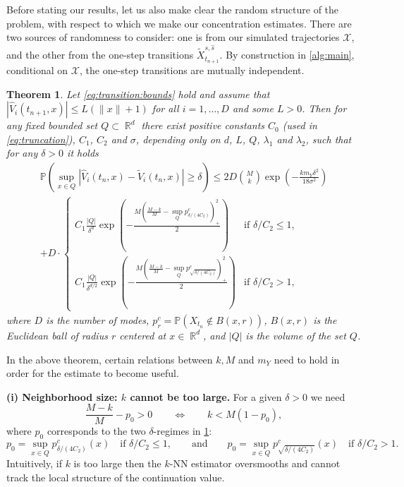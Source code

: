\documentclass[11pt,reqno,a4paper]{amsart}
\newtheorem{theorem}{Theorem}[section]
\theoremstyle{definition}
\numberwithin{equation}{section}
\renewcommand{\P}{\mathbb{P}}
\DeclareMathOperator{\R}{\mathbb{R}}
\DeclareMathOperator{\1}{\mathbbm{1}}
\begin{document}
Before stating our results, let us also make clear the random structure of the problem, with respect to which we make our concentration estimates. There are two sources of randomness to consider: one is from our simulated trajectories $\mathcal{X}$, and the other from the one-step transitions $\widetilde X_{t_{n+1}}^{s,\hat s}$. By construction in \cref{alg:main}, conditional on $\mathcal{X}$, the one-step transitions are mutually independent.

\begin{theorem} \label{thm:1}
  Let \cref{eq:transition:bounds} hold and assume that $|\widehat{V}_i(t_{n+1},x)| \leq L (\|x\|+1)$ for all $i = 1,\dots,D$ and some $L > 0$.
  Then for any fixed bounded set $Q \subset \R^d$ there exist positive constants
  $C_0$ (used in \cref{eq:truncation}), $C_1$, $C_2$ and $\sigma$, depending only on $d$, $L$, $Q$, $\lambda_1$ and $\lambda_2$, such that for any $\delta > 0$ it holds
  \begin{multline*}
    \P(\sup_{x \in Q} |\widehat{V}_i(t_n,x) - \widetilde{V}_i(t_n,x)| \geq \delta) \leq
    2D{\binom{M}{k}} \exp \left (-\frac{k m_Y\delta^2}{18 \sigma^2} \right )
    \\
    + D \cdot
    \begin{cases}
      C_1 \frac{|Q|}{\delta^d} \exp \left (-\frac{M \left (\frac{M-k}{M} - \sup_Q p_{\delta/(4 C_2)}^c \right )_+^2}{2} \right )            & \text{if } \delta/C_2 \leq 1,
      \\
      C_1 \frac{|Q|}{\delta^{d/2}} \exp \left (-\frac{M \left (\frac{M-k}{M} - \sup_Q p_{\sqrt{\delta/(4 C_2)}}^c \right )_+^2}{2} \right ) & \text{if } \delta/C_2 > 1,
    \end{cases}
  \end{multline*}
  where $D$ is the number of modes, $p_{r}^c = \P(X_{t_n} \not \in B(x,r))$, $B(x,r)$ is the Euclidean ball of radius $r$ centered at $x \in \R^d$, and $|Q|$ is the volume of the set $Q$.
\end{theorem}

In the above theorem, certain relations between $k,M$ and $m_Y$ need to hold in order for the estimate to become useful.

\medskip
\noindent\textbf{(i) Neighborhood size: $k$ cannot be too large.}
For a given $\delta>0$ we need
\begin{equation*}
  \frac{M-k}{M} - p_0 > 0 \qquad \Longleftrightarrow \qquad k < M(1-p_0),
\end{equation*}
where $p_0$ corresponds to the two $\delta$-regimes in \cref{thm:1}:
\begin{equation*}
  p_0 = \sup_{x\in Q} p_{\delta/(4C_2)}^c(x)\quad \text{if }\delta/C_2\le 1,
  \qquad\text{and}\qquad
  p_0 = \sup_{x\in Q} p_{\sqrt{\delta/(4C_2)}}^c(x)\quad \text{if }\delta/C_2>1.
\end{equation*}
Intuitively, if $k$ is too large then the $k$-NN estimator oversmooths and cannot track the local structure of the continuation value.
\end{document}
